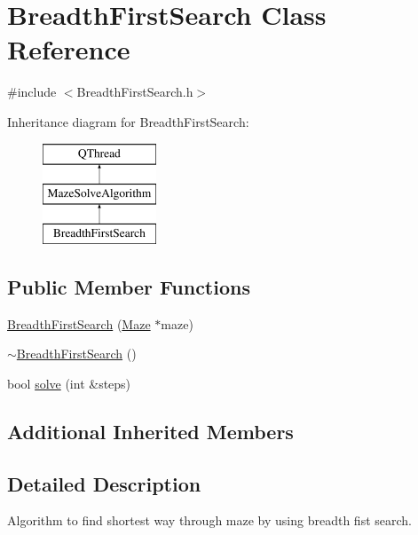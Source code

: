 \hypertarget{class_breadth_first_search}{\section{Breadth\-First\-Search Class Reference}
\label{class_breadth_first_search}
}


{\ttfamily \#include $<$Breadth\-First\-Search.\-h$>$}

Inheritance diagram for Breadth\-First\-Search\-:\begin{figure}[H]
\begin{center}
\leavevmode
\includegraphics[height=3.000000cm]{class_breadth_first_search}
\end{center}
\end{figure}
\subsection*{Public Member Functions}
\begin{DoxyCompactItemize}
\item 
\hyperlink{class_breadth_first_search_aa2eb988878d47abbb9a75de86dd3ccb6}{Breadth\-First\-Search} (\hyperlink{class_maze}{Maze} $\ast$maze)
\item 
\hyperlink{class_breadth_first_search_af56e60466779aa47b1b3c10a1a84d8ca}{$\sim$\-Breadth\-First\-Search} ()
\item 
bool \hyperlink{class_breadth_first_search_a0fccce0a839583c2e80eaacc1be8ed2e}{solve} (int \&steps)
\end{DoxyCompactItemize}
\subsection*{Additional Inherited Members}


\subsection{Detailed Description}
Algorithm to find shortest way through maze by using breadth fist search. 


